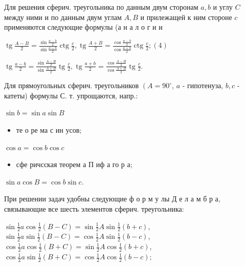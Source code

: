 \documentclass[10pt]{article}
\begin{document}
Для решения сферич. треугольника по данным двум сторонам $a, b$ и углу $C$ между ними и по данным двум углам $A, B$ и прилежащей к ним стороне $c$ применяются следующие формулы (а н а л о г и и



$\operatorname{tg} \frac{A-B}{2}=\frac{\sin \frac{a-b}{2}}{\sin \frac{a+b}{2}} \operatorname{ctg} \frac{c}{2}, \operatorname{tg} \frac{A+B}{2}=\frac{\cos \frac{a-b}{2}}{\cos \frac{a+b}{2}} \operatorname{ctg} \frac{c}{2} ;(4)$



$\operatorname{tg} \frac{a-b}{2}=\frac{\sin \frac{A-B}{2}}{\sin \frac{A+B}{2}} \operatorname{tg} \frac{c}{2}, \operatorname{tg} \frac{a+b}{2}=\frac{\cos \frac{A-B}{2}}{\cos \frac{A+B}{2}} \operatorname{tg} \frac{c}{2}$.



Для прямоугольных сферич. треугольников $\left(A=90^{\circ}\right.$, $a$ - гипотенуза, $b, c$ - катеты) формулы С. т. упрощаются, напр.:



$\sin b=\sin a \sin B$



\begin{itemize}

  \item те о ре ма с ин усов;

\end{itemize}



$\cos a=\cos b \cos c$



\begin{itemize}

  \item сфе ричсская теорем а П иф а го р а;

\end{itemize}



$\sin a \cos B=\cos b \sin c$.



При решении задач удобны следующие ф о р м у лы Д е л а м б р а, связывающие все шесть элементов сферич. треугольника:



$\sin \frac{1}{2} a \cos \frac{1}{2}(B-C)=\sin \frac{1}{2} A \sin \frac{1}{2}(b+c)$, $\sin \frac{1}{2} a \sin \frac{1}{2}(B-C)=\cos \frac{1}{2} A \sin \frac{1}{2}(b-c)$, $\cos \frac{1}{2} a \cos \frac{1}{2}(B+C)=\sin \frac{1}{2} A \cos \frac{1}{2}(b+c)$, $\cos \frac{1}{2} a \sin \frac{1}{2}(B+C)=\cos \frac{1}{2} A \cos \frac{1}{2}(b-c) ;$
\end{document}
